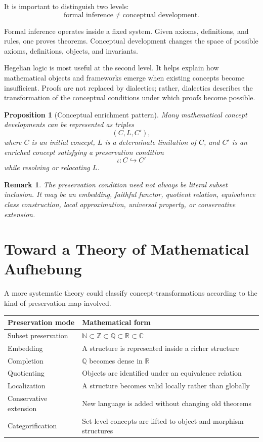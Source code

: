 \documentclass[11pt]{article}
\newtheorem{proposition}{Proposition}
\newtheorem{remark}{Remark}
\begin{document}
It is important to distinguish two levels:
\[
\text{formal inference} \neq \text{conceptual development}.
\]

Formal inference operates inside a fixed system. Given axioms, definitions, and rules, one proves theorems. Conceptual development changes the space of possible axioms, definitions, objects, and invariants.

Hegelian logic is most useful at the second level. It helps explain how mathematical objects and frameworks emerge when existing concepts become insufficient. Proofs are not replaced by dialectics; rather, dialectics describes the transformation of the conceptual conditions under which proofs become possible.

\begin{proposition}[Conceptual enrichment pattern]
Many mathematical concept developments can be represented as triples
\[
(C,L,C'),
\]
where $C$ is an initial concept, $L$ is a determinate limitation of $C$, and $C'$ is an enriched concept satisfying a preservation condition
\[
\iota:C\hookrightarrow C'
\]
while resolving or relocating $L$.
\end{proposition}

\begin{remark}
The preservation condition need not always be literal subset inclusion. It may be an embedding, faithful functor, quotient relation, equivalence class construction, local approximation, universal property, or conservative extension.
\end{remark}

\section{Toward a Theory of Mathematical Aufhebung}

A more systematic theory could classify concept-transformations according to the kind of preservation map involved.

\begin{center}
\begin{tabular}{ll}
\toprule
Preservation mode & Mathematical form \\
\midrule
Subset preservation & $\mathbb{N}\subset\mathbb{Z}\subset\mathbb{Q}\subset\mathbb{R}\subset\mathbb{C}$ \\
Embedding & A structure is represented inside a richer structure \\
Completion & $\mathbb{Q}$ becomes dense in $\mathbb{R}$ \\
Quotienting & Objects are identified under an equivalence relation \\
Localization & A structure becomes valid locally rather than globally \\
Conservative extension & New language is added without changing old theorems \\
Categorification & Set-level concepts are lifted to object-and-morphism structures \\
\bottomrule
\end{tabular}
\end{center}
\end{document}
